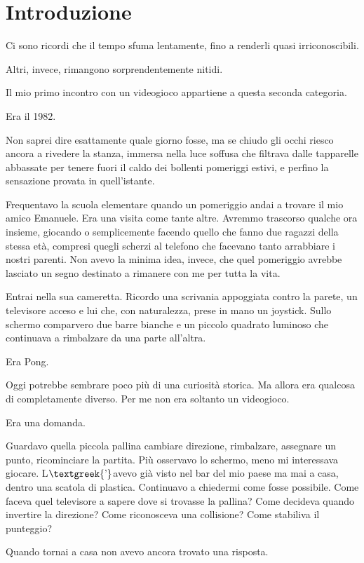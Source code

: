 \documentclass{article}
\author{HP}
\date{2026-08-07}
\begin{document}
\section{Introduzione}
Ci sono ricordi che il tempo sfuma lentamente, fino a renderli quasi irriconoscibili.

Altri, invece, rimangono sorprendentemente nitidi.

Il mio primo incontro con un videogioco appartiene a questa seconda categoria.

Era il 1982.

Non saprei dire esattamente quale giorno fosse, ma se chiudo gli occhi riesco ancora a rivedere la stanza, immersa nella
luce soffusa che filtrava dalle tapparelle abbassate per tenere fuori il caldo dei bollenti pomeriggi estivi, e perfino
la sensazione provata in quell'istante.

Frequentavo la scuola elementare quando un pomeriggio andai a trovare il mio amico Emanuele. Era una visita come tante
altre. Avremmo trascorso qualche ora insieme, giocando o semplicemente facendo quello che fanno due ragazzi della
stessa età, compresi quegli scherzi al telefono che facevano tanto arrabbiare i nostri parenti. Non avevo la minima
idea, invece, che quel pomeriggio avrebbe lasciato un segno destinato a rimanere con me per tutta la vita.

Entrai nella sua cameretta. Ricordo una scrivania appoggiata contro la parete, un televisore acceso e lui che, con
naturalezza, prese in mano un joystick. Sullo schermo comparvero due barre bianche e un piccolo quadrato luminoso che
continuava a rimbalzare da una parte all'altra.

Era Pong.

Oggi potrebbe sembrare poco più di una curiosità storica. Ma allora era qualcosa di completamente diverso. Per me non
era soltanto un videogioco.

Era una domanda.

Guardavo quella piccola pallina cambiare direzione, rimbalzare, assegnare un punto, ricominciare la partita. Più
osservavo lo schermo, meno mi interessava giocare. L$\text{\textgreek{’}}$avevo già visto nel bar del mio paese ma mai
a casa, dentro una scatola di plastica. Continuavo a chiedermi come fosse possibile. Come faceva quel televisore a
sapere dove si trovasse la pallina? Come decideva quando invertire la direzione? Come riconosceva una collisione? Come
stabiliva il punteggio?

Quando tornai a casa non avevo ancora trovato una risposta.
\end{document}
